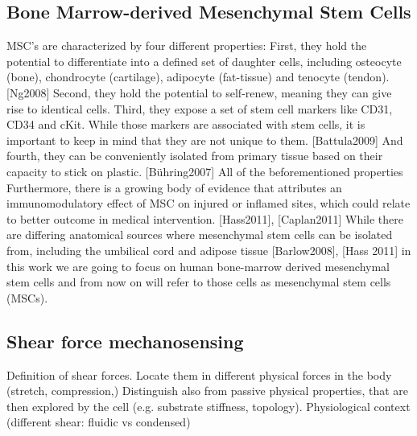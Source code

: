\subsection{Bone Marrow-derived Mesenchymal Stem Cells}
MSC's are characterized by four different properties: First, they hold the potential to differentiate into a defined set of daughter cells, including osteocyte (bone), chondrocyte (cartilage), adipocyte (fat-tissue) and tenocyte (tendon).[Ng2008] Second, they hold the potential to self-renew, meaning they can give rise to identical cells. Third, they expose a set of stem cell markers like CD31, CD34 and cKit. While those markers are associated with stem cells, it is important to keep in mind that they are not unique to them. [Battula2009] And fourth, they can be conveniently isolated from primary tissue based on their capacity to stick on plastic. [Bühring2007] All of the beforementioned properties Furthermore, there is a growing body of evidence that attributes an immunomodulatory effect of MSC on injured or inflamed sites, which could relate to better outcome in medical intervention. [Hass2011], [Caplan2011]
While there are differing anatomical sources where mesenchymal stem cells can be isolated from, including the umbilical cord and adipose tissue [Barlow2008], [Hass 2011] in this work we are going to focus on human bone-marrow derived mesenchymal stem cells and from now on will refer to those cells as mesenchymal stem cells (MSCs).


\subsection{Shear force mechanosensing}
Definition of shear forces. Locate them in different physical forces in the body (stretch, compression,) Distinguish also from passive physical properties, that are then explored by the cell (e.g. substrate stiffness, topology).
Physiological context (different shear: fluidic vs condensed)

